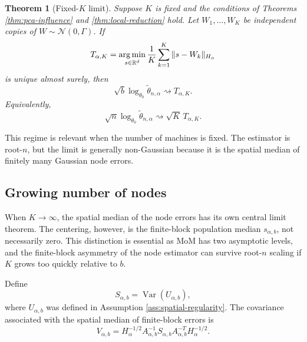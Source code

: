 \documentclass[11pt]{article}
\newtheorem{theorem}{Theorem}
\newcommand{\R}{\mathbb R}
\newcommand{\Var}{\operatorname{Var}}
\newcommand{\argmin}{\operatorname*{arg\,min}}
\newcommand{\dto}{\rightsquigarrow}
\newcommand{\Normal}{\mathcal N}
\begin{document}
\begin{theorem}[Fixed-\(K\) limit]\label{thm:fixed-K}
Suppose \(K\) is fixed and the conditions of Theorems \ref{thm:pca-influence} and \ref{thm:local-reduction} hold.  Let \(W_1,\ldots,W_K\) be independent copies of \(W\sim\Normal(0,\Gamma)\).  If
\begin{equation}\label{eq:T-alpha-K}
    T_{\alpha,K}=\argmin_{s\in\R^d}{1\over K}\sum_{k=1}^K\|s-W_k\|_{H_\alpha}
\end{equation}
 is unique almost surely, then
\begin{equation}\label{eq:fixed-K-limit}
    \sqrt b\log_{\theta_0}\widetilde\theta_{n,\alpha}
    \dto T_{\alpha,K}.
\end{equation}
Equivalently,
\begin{equation}\label{eq:fixed-K-root-n}
    \sqrt n\log_{\theta_0}\widetilde\theta_{n,\alpha}
    \dto \sqrt K\,T_{\alpha,K}.
\end{equation}
\end{theorem}

This regime is relevant when the number of machines is fixed.  The estimator is root-\(n\), but the limit is generally non-Gaussian because it is the spatial median of finitely many Gaussian node errors.

\subsection{Growing number of nodes}

When \(K\to\infty\), the spatial median of the node errors has its own central limit theorem.  The centering, however, is the finite-block population median \(s_{\alpha,b}\), not necessarily zero.  This distinction is essential as MoM has two asymptotic levels, and the finite-block asymmetry of the node estimator can survive root-\(n\) scaling if \(K\) grows too quickly relative to \(b\).

Define
\begin{equation}\label{eq:S-alpha-b}
    S_{\alpha,b}=\Var(U_{\alpha,b}),
\end{equation}
where \(U_{\alpha,b}\) was defined in Assumption \ref{ass:spatial-regularity}.  The covariance associated with the spatial median of finite-block errors is
\begin{equation}\label{eq:V-alpha-b}
    V_{\alpha,b}
    =H_\alpha^{-1/2}A_{\alpha,b}^{-1}S_{\alpha,b}A_{\alpha,b}^{-T}H_\alpha^{-1/2}.
\end{equation}
\end{document}
